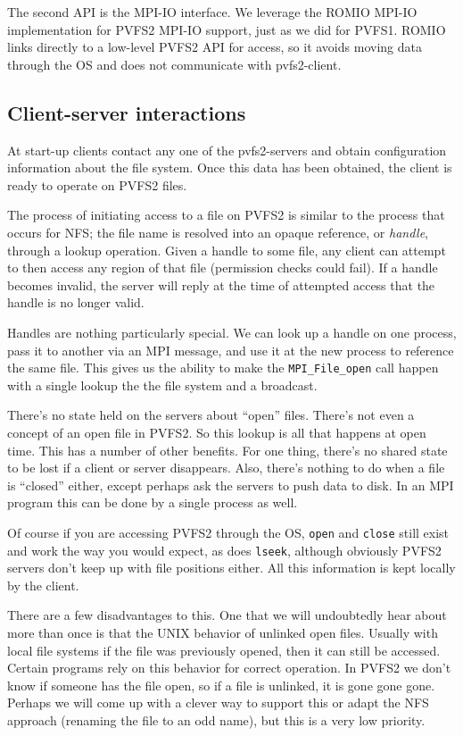 The second API is the MPI-IO interface.  We leverage the ROMIO MPI-IO
implementation for PVFS2 MPI-IO support, just as we did for PVFS1.  ROMIO
links directly to a low-level PVFS2 API for access, so it avoids moving data
through the OS and does not communicate with pvfs2-client.

\subsection{Client-server interactions}

At start-up clients contact any one of the pvfs2-servers and obtain
configuration information about the file system.  Once this data has been
obtained, the client is ready to operate on PVFS2 files.

The process of initiating access to a file on PVFS2 is similar to the process
that occurs for NFS; the file name is resolved into an opaque reference, or
\emph{handle}, through a lookup operation.  Given a handle to some file, any
client can attempt to then access any region of that file (permission checks
could fail).  If a handle becomes invalid, the server will reply at the time
of attempted access that the handle is no longer valid.

Handles are nothing particularly special.  We can look up a handle on one
process, pass it to another via an MPI message, and use it at the new process
to reference the same file.  This gives us the ability to make the
\texttt{MPI\_File\_open} call happen with a single lookup the the file system
and a broadcast.

There's no state held on the servers about ``open'' files.  There's not even a
concept of an open file in PVFS2.  So this lookup is all that happens at open
time.  This has a number of other benefits.  For one thing, there's no shared
state to be lost if a client or server disappears.  Also, there's nothing to
do when a file is ``closed'' either, except perhaps ask the servers to push
data to disk.  In an MPI program this can be done by a single process as well.

Of course if you are accessing PVFS2 through the OS, \texttt{open} and
\texttt{close} still exist and work the way you would expect, as does
\texttt{lseek}, although obviously PVFS2 servers don't keep up with file
positions either.  All this information is kept locally by the client.

There are a few disadvantages to this.  One that we will undoubtedly hear
about more than once is that the UNIX behavior of unlinked open files.
Usually with local file systems if the file was previously opened, then it can
still be accessed.  Certain programs rely on this behavior for correct
operation.  In PVFS2 we don't know if someone has the file open, so if a file
is unlinked, it is gone gone gone.  Perhaps we will come up with a clever way
to support this or adapt the NFS approach (renaming the file to an odd name),
but this is a very low priority.

